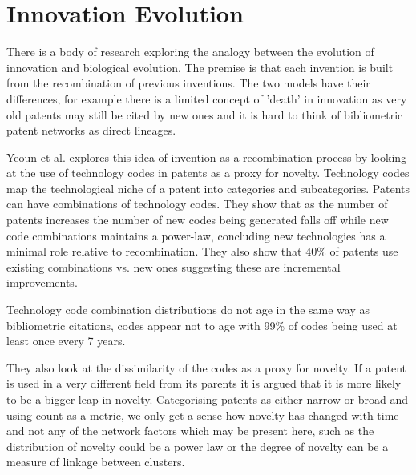 \documentclass[12pt,journal,compsoc]{IEEEtran}
\begin{document}


\section{Innovation Evolution}
There is a body of research exploring the analogy between the evolution of innovation and biological evolution. The premise is that each invention is built from the recombination of previous inventions. The two models have their differences, for example there is a limited concept of 'death' in innovation as very old patents may still be cited by new ones and it is hard to think of bibliometric patent networks as direct lineages.

Yeoun et al. \cite{youn2015invention} explores this idea of invention as a recombination process by looking at the use of technology codes in patents as a proxy for novelty. Technology codes map the technological niche of a patent into categories and subcategories. Patents can have combinations of technology codes. They show that as the number of patents increases the number of new codes being generated falls off while new code combinations maintains a power-law, concluding new technologies has a minimal role relative to recombination. They also show that 40\% of patents use existing combinations vs. new ones suggesting these are incremental improvements. 

Technology code combination distributions do not age in the same way as bibliometric citations, codes appear not to age with 99\% of codes being used at least once every 7 years. 

They also look at the dissimilarity of the codes as a proxy for novelty. If a patent is used in a very different field from its parents it is argued that it is more likely to be a bigger leap in novelty. Categorising patents as either narrow or broad and using count as a metric, we only get a sense how novelty has changed with time and not any of the network factors which may be present here, such as the distribution of novelty could be a power law or the degree of novelty can be a measure of linkage between clusters. 
\end{document}
